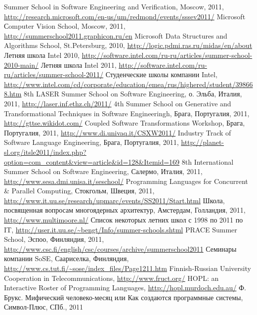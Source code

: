 \documentclass[a5paper]{article}
\begin{document}
\begin{thebibliography}{9001}
   Summer School in Software Engineering and Verification, Moscow, 2011, \url{http://research.microsoft.com/en-us/um/redmond/events/sssev2011/}
   Microsoft Сomputer Vision School, Moscow, 2011, \url{http://summerschool2011.graphicon.ru/en}
   Microsoft Data Structures and Algorithms School, St.Petersburg, 2010, \url{http://logic.pdmi.ras.ru/midas/en/about}
   Летняя школа Intel 2010, \url{http://software.intel.com/ru-ru/articles/summer-school-2010-main/}
   Летняя школа Intel 2011, \url{http://software.intel.com/ru-ru/articles/summer-school-2011/}
   Студенческие школы компании Intel, \url{http://www.intel.com/cd/corporate/education/emea/rus/highered/student/398668.htm}
   8th LASER Summer School on Software Engineering, о. Эльба, Италия, 2011, \url{http://laser.inf.ethz.ch/2011/}
   4th Summer School on Generative and Transformational Techniques in Software Engineeringh, Брага, Португалия, 2011,  \url{http://gttse.wikidot.com/}
   Coupled Software Transformations Workshop, Брага, Португалия, 2011, \url{http://www.di.univaq.it/CSXW2011/}
   Industry Track of Software Language Engineering, Брага, Португалия, 2011, \url{http://planet-sl.org/itsle2011/index.php?option=com_content&view=article&id=128&Itemid=169}
   8th International Summer School on Software Engineering, Салермо, Италия, 2011, \url{http://www.sesa.dmi.unisa.it/seschool/}
   Programming Languages for Concurrent \& Parallel Computing, Стокгольм, Швеция, 2011, \url{http://www.it.uu.se/research/upmarc/events/SS2011/Start.html}
   Школа, посвященная вопросам многоядерных архитектур, Амстердам, Голландия, 2011, \url{http://www.multimoore.nl/}
   Список некоторых летних школ с 1998 по 2011 по IT, \url{http://user.it.uu.se/~bengt/Info/summer-schools.shtml}
   PRACE Summer School, Эспоо, Финляндия, 2011, \url{http://www.csc.fi/english/csc/courses/archive/summerschool2011}
   Семинары компании SoSE, Саариселка, Финляндия, \url{http://www.cs.tut.fi/~sose/index_files/Page1211.htm}
   Finnish-Russian University Cooperation in Telecommunications, \url{http://www.fruct.org/}
   HOPL: an Interactive Roster of Programming Languages,  \url{http://hopl.murdoch.edu.au/}
   Ф. Брукс. Мифический человеко-месяц или Как создаются программные системы, Символ-Плюс, СПб., 2011

\end{thebibliography}
\end{document}
